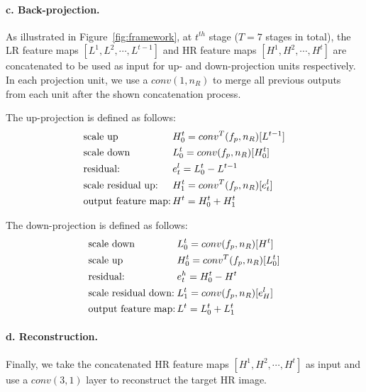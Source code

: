 \paragraph{c. Back-projection.}
As illustrated in Figure~\ref{fig:framework}, at $t^{th}$ stage
($T=7$ stages in total), the LR feature maps
$[L^1,L^2,\cdots,L^{t-1}]$ and HR feature maps $[H^1,H^2,\cdots,H^t]$
are concatenated to be used as input for up- and down-projection units
respectively. In each projection unit, we use a $conv(1, n_R)$ to
merge all previous outputs from each unit after the shown
concatenation process.

The up-projection is defined as follows:
\begin{equation}
\label{eq:up-projection}
\begin{alignedat}{2}  &\text{scale up}  \ \ \ \  && H_0^t = conv^T(f_p, n_R)[L^{t-1}]\\
 &\text{scale down}   \ \ \ \ \ &&  L_0^t = conv(f_p, n_R)[H_0^{t}] \\
 &\text{residual: } && e^l_t = L_0^t - L^{t-1}\\
 &\text{scale residual up:\,} && H_1^t = conv^T(f_p, n_R)[e_t^l] \\
 &\text{output feature map:\,} && H^t = H^t_0 + H^t_1
\end{alignedat}
\end{equation}

The down-projection is defined as follows:
\begin{equation}
\label{eq:down-projection}
\begin{alignedat}{2}  &\text{scale down}  \ \ \ \  && L_0^t = conv(f_p, n_R)[H^{t}]\\
 &\text{scale up}   \ \ \ \ \ && H_0^t = conv^T(f_p, n_R)[L_0^{t}] \\
 &\text{residual: } && e^h_t = H_0^t - H^{t}\\
 &\text{scale residual down:\,} && L_1^t = conv(f_p, n_R)[e_H^l] \\
 &\text{output feature map:\,} && L^t = L^t_0 + L^t_1
\end{alignedat}
\end{equation}

\paragraph{d. Reconstruction.}
Finally, we take the concatenated HR feature maps
$[H^1,H^2,\cdots,H^t]$ as input and use a $conv(3, 1)$ layer to
reconstruct the target HR image.
 
